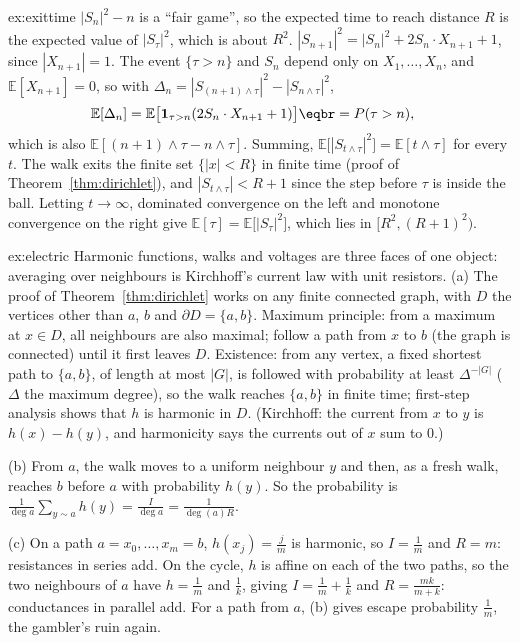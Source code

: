 \begin{solution}{ex:exittime}
\idea $|S_n|^2-n$ is a ``fair game'', so the expected time to reach distance $R$ is the expected value of $|S_\tau|^2$, which is about $R^2$.
\writeup $|S_{n+1}|^2=|S_n|^2+2S_n\cdot X_{n+1}+1$, since $|X_{n+1}|=1$. The event $\{\tau>n\}$ and $S_n$ depend only on $X_1,\dots,X_n$, and $\mathbb E[X_{n+1}]=0$, so
with $\Delta_n=|S_{(n+1)\wedge\tau}|^2-|S_{n\wedge\tau}|^2$,
\[
\begin{aligned}\mathbb E[\Delta_n]&=\mathbb E\bigl[\mathbf 1_{\tau>n}(2S_n\cdot X_{n+1}+1)\bigr]\eqbr=P(\tau>n),\end{aligned}
\]
which is also $\mathbb E[(n+1)\wedge\tau-n\wedge\tau]$. Summing, $\mathbb E\bigl[|S_{t\wedge\tau}|^2\bigr]=\mathbb E[t\wedge\tau]$ for every $t$. The walk exits the finite set $\{|x|<R\}$ in finite time
(proof of Theorem~\ref{thm:dirichlet}), and $|S_{t\wedge\tau}|<R+1$ since the step before $\tau$ is inside the ball. Letting $t\to\infty$, dominated convergence on
the left and monotone convergence on the right give $\mathbb E[\tau]=\mathbb E\bigl[|S_\tau|^2\bigr]$, which lies in $[R^2,(R+1)^2)$.
\end{solution}

\begin{solution}{ex:electric}
\idea Harmonic functions, walks and voltages are three faces of one object: averaging over neighbours is Kirchhoff's
current law with unit resistors.
\writeup (a) The proof of Theorem~\ref{thm:dirichlet} works on any finite connected graph, with $D$ the vertices other than $a$, $b$ and
$\partial D=\{a,b\}$. Maximum principle: from a maximum at $x\in D$, all neighbours are also maximal; follow a path from $x$ to $b$ (the graph is
connected) until it first leaves $D$. Existence: from any vertex, a fixed shortest path to $\{a,b\}$, of length at most $|G|$, is followed
with probability at least $\Delta^{-|G|}$ ($\Delta$ the maximum degree), so the walk reaches $\{a,b\}$ in finite time; first-step analysis shows that $h$ is
harmonic in $D$. (Kirchhoff: the current from $x$ to $y$ is $h(x)-h(y)$, and harmonicity says the currents out of $x$ sum to $0$.)

(b) From $a$, the walk moves to a uniform neighbour $y$ and then, as a fresh walk, reaches $b$ before $a$ with probability $h(y)$. So the
probability is $\frac1{\deg a}\sum_{y\sim a}h(y)=\frac I{\deg a}=\frac1{\deg(a)R}$.

(c) On a path $a=x_0,\dots,x_m=b$, $h(x_j)=\frac jm$ is harmonic, so $I=\frac1m$ and $R=m$: resistances in series add. On the cycle, $h$ is affine on each of
the two paths, so the two neighbours of $a$ have $h=\frac1m$ and $\frac1k$, giving $I=\frac1m+\frac1k$ and $R=\frac{mk}{m+k}$: conductances in parallel add. For a path
from $a$, (b) gives escape probability $\frac1m$, the gambler's ruin again.
\end{solution}

